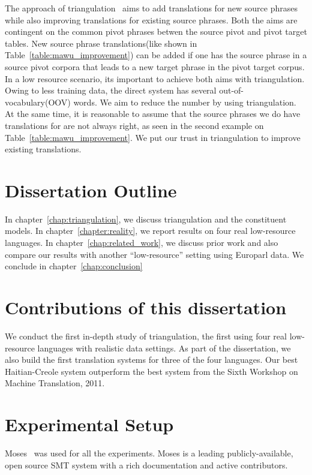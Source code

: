 The approach of triangulation~\cite{Cohn:07,Utiyama:07,Nakov:12} aims to add translations for new source phrases while also improving translations for existing source phrases. Both the aims are contingent on the common pivot phrases betwen the source pivot and pivot target tables. New source phrase translations(like shown in Table~\ref{table:mawu_improvement}) can be added if one has the source phrase in a source pivot corpora that leads to a new target phrase in the pivot target corpus. In a low resource scenario, its important to achieve both aims with triangulation. Owing to less training data, the direct system has several out-of-vocabulary(OOV) words. We aim to reduce the number by using triangulation. At the same time, it is reasonable to assume that the source phrases we do have translations for are not always right, as seen in the second example on Table~\ref{table:mawu_improvement}. We put our trust in triangulation to improve existing translations. 

\section{Dissertation Outline}
\label{sec:outline}

In chapter~\ref{chap:triangulation}, we discuss triangulation and the constituent models. In chapter~\ref{chapter:reality}, we report results on four real low-resource languages. In chapter~\ref{chap:related_work}, we discuss prior work and also compare our results with another ``low-resource'' setting using Europarl data. We conclude in chapter~\ref{chap:conclusion}

\section{Contributions of this dissertation}
\label{sec:summary}
We conduct the first in-depth study of triangulation, the first using four real low-resource languages with realistic data settings. As part of the dissertation, we also build the first translation systems for three of the four languages. Our best Haitian-Creole system outperform the best system from the Sixth Workshop on Machine Translation, 2011. 


\section{Experimental Setup}
\label{sec:setup}


Moses~\cite{Koehn:07} was used for all the experiments. Moses is a leading publicly-available, open source SMT system with a rich documentation and active contributors. 

